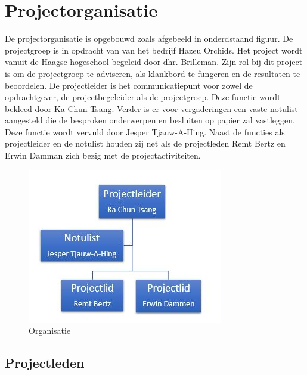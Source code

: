 \section{Projectorganisatie}

De projectorganisatie is opgebouwd zoals afgebeeld in onderdstaand figuur. De projectgroep is in opdracht van van het bedrijf Hazeu Orchids.
Het project wordt vanuit de Haagse hogeschool begeleid door dhr. Brilleman. Zijn rol bij
dit project is om de projectgroep te adviseren, als klankbord te fungeren en de resultaten
te beoordelen. De projectleider is het communicatiepunt voor zowel de opdrachtgever, de
projectbegeleider als de projectgroep. Deze functie wordt bekleed door Ka Chun Tsang.
Verder is er voor vergaderingen een vaste notulist aangesteld die de besproken onderwerpen
en besluiten op papier zal vastleggen. Deze functie wordt vervuld door Jesper Tjauw-A-Hing.
Naast de functies als projectleider en de notulist houden zij net als de projectleden Remt Bertz en Erwin Damman zich bezig met de projectactiviteiten.

\begin{figure}[h]
	\centering
	\includegraphics[width=\textwidth]{Afbeeldingen/Organisatie.JPG}
	\caption{Organisatie} 
\end{figure}

\newpage

\subsection{Projectleden}

